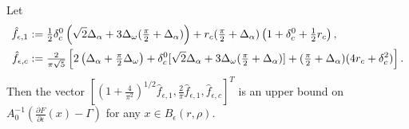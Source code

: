 \begin{lemma}
	\label{lem:ImplicitLast}
Let 
	\begin{alignat}{1}
	\hat{f}_{\epsilon,1} &:= \tfrac{1}{2} \delta_c^0 \left(   \sqrt{2} \Delta_\alpha  +3  \Delta_\omega ( \tfrac{\pi}{2} + \Delta_\alpha ) \right)  +  r_c  ( \tfrac{\pi}{2} + \Delta_\alpha) 
	\left(1 + \delta_c^0  + \tfrac{1}{2} r_c \right)  , \label{e:feps1} \\
	\hat{f}_{\epsilon,c} &:= 
	\tfrac{2}{\pi \sqrt{5}} \left[ 
	 2 \left( \Delta_\alpha + \tfrac{\pi}{2} \Delta_\omega \right) + \delta_c^0  [ \sqrt{2} \Delta_\alpha + 3 \Delta_\omega (\tfrac{\pi}{2}+\Delta_\alpha) ]
	+(\tfrac{\pi}{2}+\Delta_\alpha) ( 4 r_c + \delta_c^2)
	\right] .\label{e:fepsc}
	\end{alignat}
	Then  the vector 
	$
	[	(1+\tfrac{4}{\pi^2})^{1/2}\hat{f}_{\epsilon,1},\tfrac{2}{\pi} \hat{f}_{\epsilon,1}, \hat{f}_{\epsilon,c}]^{T}
	$
	is an upper bound on $A_0^{-1}  ( \tfrac{\partial F}{\partial  \epsilon} (x) -\Gamma )$ for any $ x \in B_\epsilon ( r,\rho)$.
\end{lemma}


